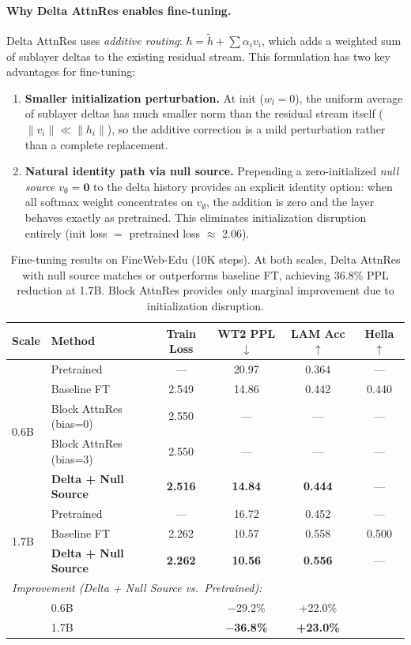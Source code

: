 \documentclass{article}
\begin{document}
\paragraph{Why Delta AttnRes enables fine-tuning.} Delta AttnRes uses \emph{additive routing}: $h = \tilde{h} + \sum \alpha_i v_i$, which adds a weighted sum of sublayer deltas to the existing residual stream. This formulation has two key advantages for fine-tuning:

\begin{enumerate}
    \item \textbf{Smaller initialization perturbation.} At init ($w_l = 0$), the uniform average of sublayer deltas has much smaller norm than the residual stream itself ($\|v_i\| \ll \|h_i\|$), so the additive correction is a mild perturbation rather than a complete replacement.
    \item \textbf{Natural identity path via null source.} Prepending a zero-initialized \emph{null source} $v_\emptyset = \mathbf{0}$ to the delta history provides an explicit identity option: when all softmax weight concentrates on $v_\emptyset$, the addition is zero and the layer behaves exactly as pretrained. This eliminates initialization disruption entirely (init loss $=$ pretrained loss $\approx$ 2.06).
\end{enumerate}

\begin{table}[h]
\centering
\caption{Fine-tuning results on FineWeb-Edu (10K steps). At both scales, Delta AttnRes with null source matches or outperforms baseline FT, achieving 36.8\% PPL reduction at 1.7B. Block AttnRes provides only marginal improvement due to initialization disruption.}
\label{tab:finetune}
\begin{tabular}{llcccc}
\toprule
\textbf{Scale} & \textbf{Method} & \textbf{Train Loss} & \textbf{WT2 PPL $\downarrow$} & \textbf{LAM Acc $\uparrow$} & \textbf{Hella $\uparrow$} \\
\midrule
\multirow{5}{*}{0.6B} & Pretrained & --- & 20.97 & 0.364 & --- \\
 & Baseline FT & 2.549 & 14.86 & 0.442 & 0.440 \\
 & Block AttnRes (bias=0) & 2.550 & --- & --- & --- \\
 & Block AttnRes (bias=3) & 2.550 & --- & --- & --- \\
 & \textbf{Delta + Null Source} & \textbf{2.516} & \textbf{14.84} & \textbf{0.444} & --- \\
\midrule
\multirow{3}{*}{1.7B} & Pretrained & --- & 16.72 & 0.452 & --- \\
 & Baseline FT & 2.262 & 10.57 & 0.558 & 0.500 \\
 & \textbf{Delta + Null Source} & \textbf{2.262} & \textbf{10.56} & \textbf{0.556} & --- \\
\midrule
\multicolumn{6}{l}{\textit{Improvement (Delta + Null Source vs.\ Pretrained):}} \\
 & 0.6B & & $-$29.2\% & +22.0\% & \\
 & 1.7B & & \textbf{$-$36.8\%} & \textbf{+23.0\%} & \\
\bottomrule
\end{tabular}
\end{table}
\end{document}
